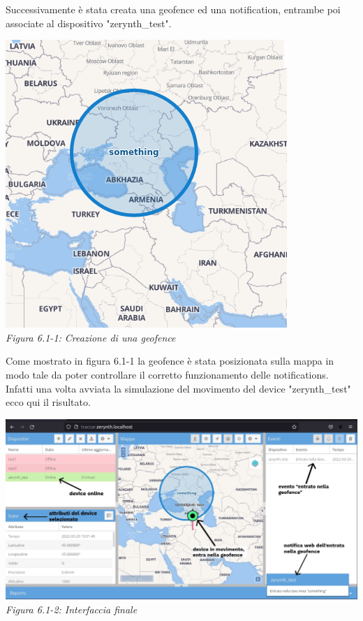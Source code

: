 \documentclass[a4paper,titlepage,12pt]{book}
\begin{document}
Successivamente è stata creata una geofence ed una notification, entrambe poi associate al dispositivo "zerynth\_test". 

\begin{center}
\includegraphics[scale=0.6]{images/geofence.png}\\ 
\textit{Figura 6.1-1: Creazione di una geofence}
\end{center}


Come mostrato in figura 6.1-1 la geofence è stata posizionata sulla mappa in modo tale da poter controllare il corretto funzionamento delle notifications. Infatti una volta avviata la simulazione del movimento del device "zerynth\_test" ecco qui il risultato.
\\
\begin{center}
\includegraphics[scale=1.5]{images/interfaccia_completa.jpg}\\ 
\textit{Figura 6.1-2: Interfaccia finale}
\end{center}
\end{document}
